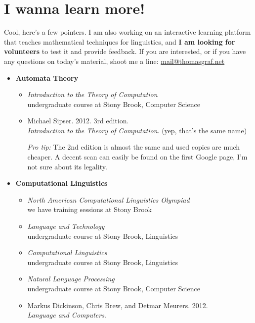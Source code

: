 \section{I wanna learn more!}

Cool, here's a few pointers.
I am also working on an interactive learning platform that teaches mathematical techniques for linguistics, and \textbf{\textcolor{Red3}{I am looking for volunteers}} to test it and provide feedback.
If you are interested, or if you have any questions on today's material, shoot me a line: \href{mailto:mail@thomasgraf.net}{mail@thomasgraf.net}

\begin{itemize}
    \item \textbf{Automata Theory}
        \begin{itemize}
            \item \emph{Introduction to the Theory of Computation}\\
                undergraduate course at Stony Brook, Computer Science
            \item Michael Sipser. 2012. 3rd edition.\\
                \emph{Introduction to the Theory of Computation}. (yep, that's the same name)

                \smallskip
                \emph{Pro tip:} The 2nd edition is almost the same and used copies are much cheaper.
                A decent scan can easily be found on the first Google page, I'm not sure about its legality.
        \end{itemize}
    \item \textbf{Computational Linguistics}
        \begin{itemize}
            \item \emph{North American Computational Linguistics Olympiad}\\
                we have training sessions at Stony Brook
            \item \emph{Language and Technology}\\
                undergraduate course at Stony Brook, Linguistics
            \item \emph{Computational Linguistics}\\
                undergraduate course at Stony Brook, Linguistics
            \item \emph{Natural Language Processing}\\
                undergraduate course at Stony Brook, Computer Science
            \item Markus Dickinson, Chris Brew, and Detmar Meurers. 2012.\\
                \emph{Language and Computers}.


\end{itemize}
\end{itemize}
